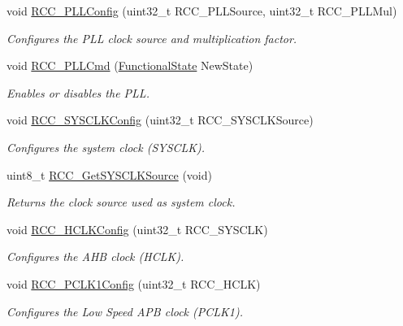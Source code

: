 \begin{DoxyCompactItemize}
void \hyperlink{group___r_c_c___exported___functions_ga0f67634cbe721f2c42f022d2a93229c8}{R\+C\+C\+\_\+\+P\+L\+L\+Config} (uint32\+\_\+t R\+C\+C\+\_\+\+P\+L\+L\+Source, uint32\+\_\+t R\+C\+C\+\_\+\+P\+L\+L\+Mul)
\begin{DoxyCompactList}\small\item\em Configures the P\+LL clock source and multiplication factor. \end{DoxyCompactList}\item 
void \hyperlink{group___r_c_c___exported___functions_ga84dee53c75e58fdb53571716593c2272}{R\+C\+C\+\_\+\+P\+L\+L\+Cmd} (\hyperlink{group___exported__types_gac9a7e9a35d2513ec15c3b537aaa4fba1}{Functional\+State} New\+State)
\begin{DoxyCompactList}\small\item\em Enables or disables the P\+LL. \end{DoxyCompactList}\item 
void \hyperlink{group___r_c_c___exported___functions_ga3551a36a8f0a3dc96a74d6b939048337}{R\+C\+C\+\_\+\+S\+Y\+S\+C\+L\+K\+Config} (uint32\+\_\+t R\+C\+C\+\_\+\+S\+Y\+S\+C\+L\+K\+Source)
\begin{DoxyCompactList}\small\item\em Configures the system clock (S\+Y\+S\+C\+LK). \end{DoxyCompactList}\item 
uint8\+\_\+t \hyperlink{group___r_c_c___exported___functions_gaaeb32311c208b2a980841c9c884a41ea}{R\+C\+C\+\_\+\+Get\+S\+Y\+S\+C\+L\+K\+Source} (void)
\begin{DoxyCompactList}\small\item\em Returns the clock source used as system clock. \end{DoxyCompactList}\item 
void \hyperlink{group___r_c_c___exported___functions_ga9d0aec72e236c6cdf3a3a82dfb525491}{R\+C\+C\+\_\+\+H\+C\+L\+K\+Config} (uint32\+\_\+t R\+C\+C\+\_\+\+S\+Y\+S\+C\+LK)
\begin{DoxyCompactList}\small\item\em Configures the A\+HB clock (H\+C\+LK). \end{DoxyCompactList}\item 
void \hyperlink{group___r_c_c___exported___functions_ga448137346d4292985d4e7a61dd1a824f}{R\+C\+C\+\_\+\+P\+C\+L\+K1\+Config} (uint32\+\_\+t R\+C\+C\+\_\+\+H\+C\+LK)
\begin{DoxyCompactList}\small\item\em Configures the Low Speed A\+PB clock (P\+C\+L\+K1). \end{DoxyCompactList}\item 

\end{DoxyCompactItemize}
